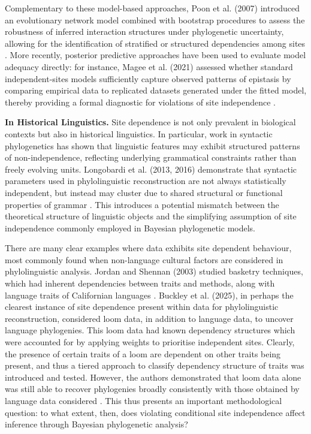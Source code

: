 Complementary to these model-based approaches, Poon et al. (2007) introduced an evolutionary network model combined with bootstrap procedures to assess the robustness of inferred interaction structures under phylogenetic uncertainty, allowing for the identification of stratified or structured dependencies among sites \cite{Poon2007}. More recently, posterior predictive approaches have been used to evaluate model adequacy directly: for instance, Magee et al. (2021) assessed whether standard independent-sites models sufficiently capture observed patterns of epistasis by comparing empirical data to replicated datasets generated under the fitted model, thereby providing a formal diagnostic for violations of site independence \cite{Magee2021}.

\textbf{In Historical Linguistics.} Site dependence is not only prevalent in biological contexts but also in historical linguistics. In particular, work in syntactic phylogenetics has shown that linguistic features may exhibit structured patterns of non-independence, reflecting underlying grammatical constraints rather than freely evolving units. Longobardi et al. (2013, 2016) demonstrate that syntactic parameters used in phylolinguistic reconstruction are not always statistically independent, but instead may cluster due to shared structural or functional properties of grammar \cite{Longobardi2013, Longobardi2016}. This introduces a potential mismatch between the theoretical structure of linguistic objects and the simplifying assumption of site independence commonly employed in Bayesian phylogenetic models.

There are many clear examples where data exhibits site dependent behaviour, most commonly found when non-language cultural factors are considered in phylolinguistic analysis. Jordan and Shennan (2003) studied basketry techniques, which had inherent dependencies between traits and methods, along with language traits of Californian languages \cite{Jordan2003}. Buckley et al. (2025), in perhaps the clearest instance of site dependence present within data for phylolinguistic reconstruction, considered loom data, in addition to language data, to uncover language phylogenies. This loom data had known dependency structures which were accounted for by applying weights to prioritise independent sites. Clearly, the presence of certain traits of a loom are dependent on other traits being present, and thus a tiered approach to classify dependency structure of traits was introduced and tested. However, the authors demonstrated that loom data alone was still able to recover phylogenies broadly consistently with those obtained by language data considered \cite{Buckley2025}. This thus presents an important methodological question: to what extent, then, does violating conditional site independence affect inference through Bayesian phylogenetic analysis?


